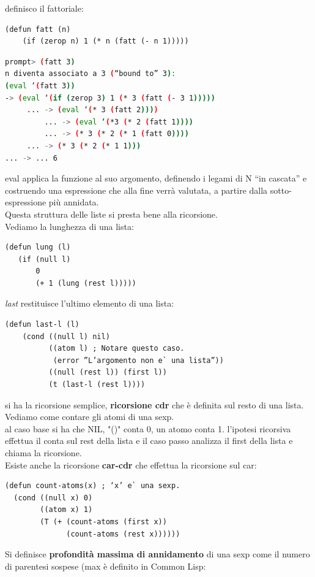 \documentclass[a4paper,12pt, oneside]{book}
\begin{document}
\newpage
definisco il fattoriale:
\begin{verbatim}
(defun fatt (n)
    (if (zerop n) 1 (* n (fatt (- n 1)))))
\end{verbatim}
\begin{shaded}
\begin{lstlisting}[language=bash]
prompt> (fatt 3)
n diventa associato a 3 (“bound to” 3):
(eval ‘(fatt 3))
-> (eval ‘(if (zerop 3) 1 (* 3 (fatt (- 3 1)))))
     ... -> (eval ‘(* 3 (fatt 2))))
         ... -> (eval ‘(*3 (* 2 (fatt 1))))
         ... -> (* 3 (* 2 (* 1 (fatt 0))))
     ... -> (* 3 (* 2 (* 1 1)))
... -> ... 6
\end{lstlisting}
\end{shaded}
eval applica la funzione al suo argomento, definendo i legami di N “in cascata” e
costruendo una espressione che alla fine verrà valutata, a partire dalla sotto-espressione
più annidata.\\ Questa struttura delle liste si presta bene alla ricorsione. \\
Vediamo la lunghezza di una lista:
\begin{verbatim}
(defun lung (l)
   (if (null l)
       0
       (+ 1 (lung (rest l)))))
\end{verbatim}
\textit{last} restituisce l'ultimo elemento di una lista:
\begin{verbatim}
(defun last-l (l)
    (cond ((null l) nil)
          ((atom l) ; Notare questo caso.
           (error ”L’argomento non e` una lista”))
          ((null (rest l)) (first l))
          (t (last-l (rest l))))
\end{verbatim}
si ha la ricorsione semplice, \textbf{ricorsione cdr} che è definita sul resto di una lista.\\
Vediamo come contare gli atomi di una sexp.\\
al caso base si ha che NIL, "()" conta 0, un atomo conta 1. l'ipotesi ricorsiva effettua il conta sul rest della lista e il caso passo analizza il first della lista e chiama la ricorsione.
\\
Esiste anche la ricorsione \textbf{car-cdr} che effettua la ricorsione sul car:
\begin{verbatim}
(defun count-atoms(x) ; ‘x’ e` una sexp.
  (cond ((null x) 0)
        ((atom x) 1)
        (T (+ (count-atoms (first x))
              (count-atoms (rest x))))))
\end{verbatim}
Si definisce \textbf{profondità massima di annidamento} di una sexp come il numero di parentesi sospese (max è definito in Common Lisp:
\end{document}
